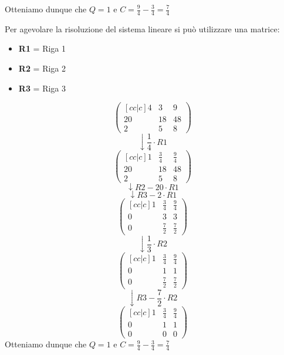 \documentclass[a4paper]{article}
\theoremstyle{break}
\theoremstyle{break}
\theoremstyle{break}
\theoremstyle{break}
\begin{document}
\begin{example}
	\noindent Otteniamo dunque che \( Q = 1 \) e \( C = \frac{9}{4} - \frac{3}{4} = \frac{7}{4} \)

	\vspace{0.5cm}

	\noindent Per agevolare la risoluzione del sistema lineare si può utilizzare una matrice:
	\begin{itemize}
		\item \textbf{R1} = Riga 1
		\item \textbf{R2} = Riga 2
		\item \textbf{R3} = Riga 3
	\end{itemize}
	\[
		\begin{pmatrix}[cc|c]
			4  & 3  & 9  \\
			20 & 18 & 48 \\
			2  & 5  & 8
		\end{pmatrix}
	\]
	\[\downarrow \frac{1}{4} \cdot R1 \]
	\[
		\begin{pmatrix}[cc|c]
			1  & \frac{3}{4} & \frac{9}{4} \\
			20 & 18          & 48          \\
			2  & 5           & 8
		\end{pmatrix}
	\]
	\[
		\downarrow R2 - 20 \cdot R1
	\]
	\[
		\downarrow R3 - 2 \cdot R1
	\]
	\[
		\begin{pmatrix} [cc|c]
			1 & \frac{3}{4} & \frac{9}{4} \\
			0 & 3           & 3           \\
			0 & \frac{7}{2} & \frac{7}{2}
		\end{pmatrix}
	\]
	\[
		\downarrow \frac{1}{3} \cdot R2
	\]
	\[
		\begin{pmatrix}[cc|c]
			1 & \frac{3}{4} & \frac{9}{4} \\
			0 & 1           & 1           \\
			0 & \frac{7}{2} & \frac{7}{2}
		\end{pmatrix}
	\]
	\[
		\downarrow R3 - \frac{7}{2} \cdot R2
	\]
	\[
		\begin{pmatrix}[cc|c]
			1 & \frac{3}{4} & \frac{9}{4} \\
			0 & 1           & 1           \\
			0 & 0           & 0
		\end{pmatrix}
	\]
	\noindent Otteniamo dunque che \( Q = 1 \) e \( C = \frac{9}{4} - \frac{3}{4} = \frac{7}{4} \)
\end{example}
\end{document}
